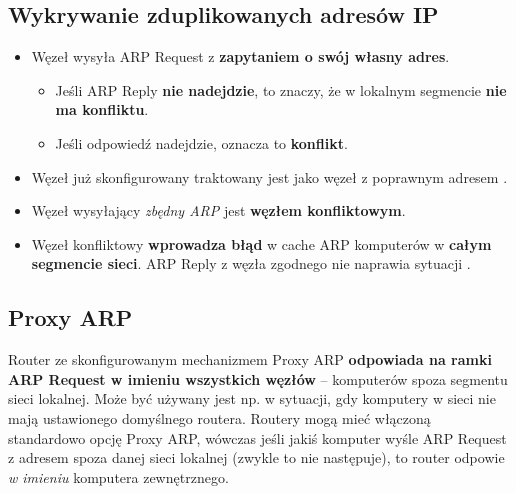 \documentclass[../sk-egzamin.tex]{subfiles}
\begin{document}
\subsection*{Wykrywanie zduplikowanych adresów IP }

\begin{itemize}
    \item Węzeł wysyła ARP Request z \textbf{zapytaniem o swój własny adres}.
    \begin{itemize}
        \item Jeśli ARP Reply \textbf{nie nadejdzie}, to znaczy, że w lokalnym
        segmencie \textbf{nie ma konfliktu}.

        \item Jeśli odpowiedź nadejdzie, oznacza to \textbf{konflikt}.
    \end{itemize}

    \item Węzeł już skonfigurowany traktowany jest jako węzeł z poprawnym
    adresem .

    \item Węzeł wysyłający \textit{zbędny ARP} jest \textbf{węzłem konfliktowym}.

    \item Węzeł konfliktowy \textbf{wprowadza błąd} w cache ARP komputerów w
    \textbf{całym segmencie sieci}.
    ARP Reply z węzła zgodnego nie naprawia sytuacji
    .
\end{itemize}

\subsection*{Proxy ARP}

Router ze skonfigurowanym mechanizmem Proxy ARP
\textbf{odpowiada na ramki ARP Request w imieniu wszystkich węzłów}
– komputerów spoza segmentu sieci lokalnej.
Może być używany jest np. w sytuacji, gdy komputery w sieci nie mają ustawionego
domyślnego routera.
Routery mogą mieć włączoną standardowo opcję Proxy ARP, wówczas jeśli jakiś
komputer wyśle ARP Request z adresem spoza danej sieci lokalnej (zwykle to nie
następuje), to router odpowie \textit{w imieniu} komputera zewnętrznego.

\pagebreak
\end{document}

